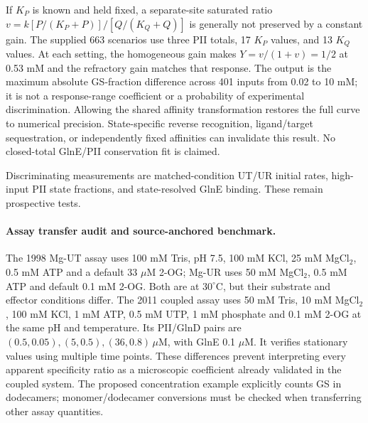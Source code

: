 \documentclass[11pt]{article}
\begin{document}
If $K_P$ is known and held fixed, a separate-site saturated ratio $v=k[P/(K_P+P)]/[Q/(K_Q+Q)]$ is generally not preserved by a constant gain. The supplied 663 scenarios use three PII totals, 17 $K_P$ values, and 13 $K_Q$ values. At each setting, the homogeneous gain makes $Y=v/(1+v)=1/2$ at 0.53 mM and the refractory gain matches that response. The output is the maximum absolute GS-fraction difference across 401 inputs from 0.02 to 10 mM; it is not a response-range coefficient or a probability of experimental discrimination. Allowing the shared affinity transformation restores the full curve to numerical precision. State-specific reverse recognition, ligand/target sequestration, or independently fixed affinities can invalidate this result. No closed-total GlnE/PII conservation fit is claimed.

Discriminating measurements are matched-condition UT/UR initial rates, high-input PII state fractions, and state-resolved GlnE binding. These remain prospective tests.


\clearpage

\paragraph{Assay transfer audit and source-anchored benchmark.}
The 1998 Mg-UT assay uses 100 mM Tris, pH 7.5, 100 mM KCl, 25 mM MgCl$_2$, 0.5 mM ATP and a default 33 $\mu$M 2-OG; Mg-UR uses 50 mM MgCl$_2$, 0.5 mM ATP and default 0.1 mM 2-OG. Both are at $30^\circ$C, but their substrate and effector conditions differ. The 2011 coupled assay uses 50 mM Tris, 10 mM MgCl$_2$, 100 mM KCl, 1 mM ATP, 0.5 mM UTP, 1 mM phosphate and 0.1 mM 2-OG at the same pH and temperature. Its PII/GlnD pairs are $(0.5,0.05),(5,0.5),(36,0.8)\,\mu$M, with GlnE 0.1 $\mu$M. It verifies stationary values using multiple time points. These differences prevent interpreting every apparent specificity ratio as a microscopic coefficient already validated in the coupled system. The proposed concentration example explicitly counts GS in dodecamers; monomer/dodecamer conversions must be checked when transferring other assay quantities.
\end{document}
